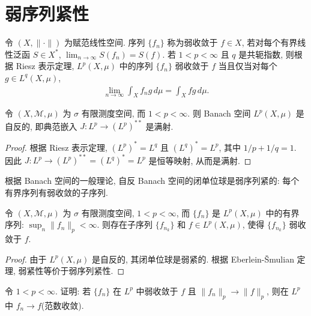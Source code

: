 \documentclass[../../main.tex]{subfiles}
\begin{document}
\section{弱序列紧性}\label{section:ch19-weak-compactness}

令 $(X,\|\cdot\|)$ 为赋范线性空间. 序列 $\{f_{n}\}$ 称为弱收敛于 $f\in X$, 若对每个有界线性泛函 $S\in X^{*}$, $\lim_{n\to\infty}S(f_{n})=S(f)$. 若 $1<p<\infty$ 且 $q$ 是共轭指数, 则根据 Riesz 表示定理, $L^{p}(X,\mu)$ 中的序列 $\{f_{n}\}$ 弱收敛于 $f$ 当且仅当对每个 $g\in L^{q}(X,\mu)$,
\begin{align*}
\lim_{n\to\infty}\int_{X}f_{n}g\,d\mu=\int_{X}fg\,d\mu.
\end{align*}

\begin{theorem}[自反性]\label{theorem:ch19-reflexivity}
令 $(X,\mathcal{M},\mu)$ 为 $\sigma$ 有限测度空间, 而 $1<p<\infty$. 则 Banach 空间 $L^{p}(X,\mu)$ 是自反的, 即典范嵌入 $J:L^{p}\to(L^{p})^{**}$ 是满射.
\end{theorem}

\begin{proof}
根据 Riesz 表示定理, $(L^{p})^{*}=L^{q}$ 且 $(L^{q})^{*}=L^{p}$, 其中 $1/p+1/q=1$. 因此 $J:L^{p}\to(L^{p})^{**}=(L^{q})^{*}=L^{p}$ 是恒等映射, 从而是满射.
\end{proof}

根据 Banach 空间的一般理论, 自反 Banach 空间的闭单位球是弱序列紧的: 每个有界序列有弱收敛的子序列.

\begin{theorem}[弱序列紧性]\label{theorem:ch19-weak-sequential-compactness}
令 $(X,\mathcal{M},\mu)$ 为 $\sigma$ 有限测度空间, $1<p<\infty$, 而 $\{f_{n}\}$ 是 $L^{p}(X,\mu)$ 中的有界序列: $\sup_{n}\|f_{n}\|_{p}<\infty$. 则存在子序列 $\{f_{n_{k}}\}$ 和 $f\in L^{p}(X,\mu)$, 使得 $\{f_{n_{k}}\}$ 弱收敛于 $f$.
\end{theorem}

\begin{proof}
由于 $L^{p}(X,\mu)$ 是自反的, 其闭单位球是弱紧的. 根据 Eberlein-\v{S}mulian 定理, 弱紧性等价于弱序列紧性.
\end{proof}

\begin{exercise}\label{exercise:ch19-10}
令 $1<p<\infty$. 证明: 若 $\{f_{n}\}$ 在 $L^{p}$ 中弱收敛于 $f$ 且 $\|f_{n}\|_{p}\to\|f\|_{p}$, 则在 $L^{p}$ 中 $f_{n}\to f$(范数收敛).
\end{exercise}
\end{document}
